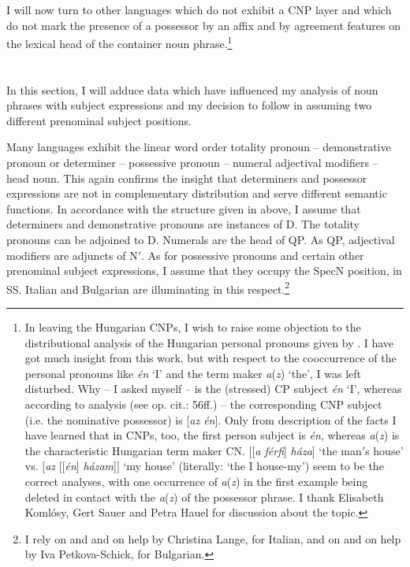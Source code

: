 \documentclass[output=paper,colorlinks,citecolor=brown]{langscibook}
\begin{document}
I will now turn to other languages which do not exhibit a CNP layer and which do not mark the presence of a possessor by an affix and by agreement features on the lexical head of the container noun phrase.\footnote{\label{fn:zi91:15} In leaving the Hungarian CNPs, I wish to raise some objection to the distributional analysis of the Hungarian personal pronouns given by \citet{Reichert86Verteilung-und-Leistung}. I have got much insight from this work, but with respect to the cooccurrence of the personal pronouns like \textit{én} `I' and the term maker \textit{a}(\textit{z}) ‘the’, I was left disturbed. Why -- I asked myself -- is the (stressed) CP subject \textit{én} `I', whereas according to  analysis (see op. cit.: 56ff.) -- the corresponding CNP subject (i.e. the nominative possessor) is [\textit{az én}]. Only from  description of the facts I have learned that in CNPs, too, the first person subject is \textit{én}, whereas \textit{a}(\textit{z}) is the characteristic Hungarian term maker CN. [[\textit{a férfi}] \textit{háza}] `the man$'$s house' vs. [\textit{az} [[\textit{én}] \textit{házam}]] `my house' (literally: `the I house-my') seem to be the correct analyses, with one occurrence of \textit{a}(\textit{z}) in the first example being deleted in contact with the \textit{a}(\textit{z}) of the possessor phrase. I thank Elisabeth Komlósy, Gert Sauer and Petra Hauel for discussion about the topic.}

\section{} \label{sec:zi91:4}

In this section, I will adduce data which have influenced my analysis of noun phrases with subject expressions and my decision to follow \citet{Szabolosi87Functional-categories} in assuming two different prenominal subject positions.

Many languages exhibit the linear word order totality pronoun -- demonstrative pronoun or determiner -- possessive pronoun -- numeral adjectival modifiers -- head noun. This again confirms the insight that determiners and possessor expressions are not in complementary distribution and serve different semantic functions. In accordance with the structure given in  above, I assume that determiners and demonstrative pronouns are instances of D. The totality pronouns can be adjoined to D. Numerals are the head of QP. As QP, adjectival modifiers are adjuncts of N$'$. As for possessive pronouns and certain other prenominal subject expressions, I assume that they occupy the SpecN position, in SS. Italian and Bulgarian are illuminating in this respect.\footnote{I rely on \citet{Honti14Italienische-Elementargrammatik} and \citet{Sauer21Italienische-Konversationsgrammatik} and on help by Christina Lange, for Italian, and on \citet{Walter87Lehrbuch-der-bulgarischen} and on help by Iva Petkova-Schick, for Bulgarian.}
\end{document}
